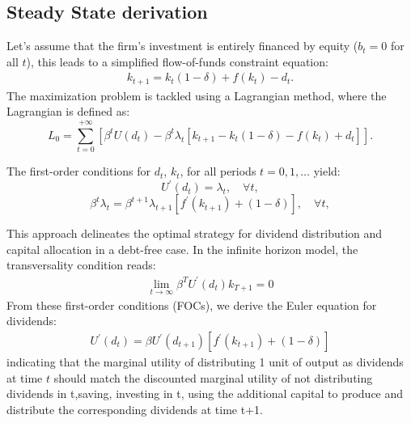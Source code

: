 \documentclass[12pt]{report}
\begin{document}
\subsection{Steady State derivation}
Let's assume that the firm's investment is entirely financed by equity (\(b_t=0\)  for all \(t\)), this leads to a simplified flow-of-funds constraint equation:
\begin{align}
    k_{t+1} = k_{t}(1 - \delta) + f(k_{t}) - d_{t}.  \label{eq13}
\end{align}
The maximization problem is tackled using a Lagrangian method, where the Lagrangian is defined as:
\[L_0 = \sum_{t=0}^{+\infty}\left[{\beta^t U(d_t) - \beta^t \lambda_t\left[k_{t+1} - k_{t}(1 - \delta) - f(k_t) + d_t\right]}\right].\]

The first-order conditions for \(d_{t}\), \(k_{t}\), for all periods \(t=0,1,\ldots\) yield:
\[
U^{\prime}(d_{t}) = \lambda_t, \quad \forall t,
\]
\[
\beta^t \lambda_t = \beta^{t+1} \lambda_{t+1}[f^{\prime}(k_{t+1}) + (1-\delta)], \quad \forall t,
\]


This approach delineates the optimal strategy for dividend distribution and capital allocation in a debt-free
case.
In the infinite horizon model, the transversality condition reads:
\begin{align}
    \lim _{t \rightarrow \infty} \beta^T U^{\prime}\left(d_{t}\right) k_{T+1}=0 \label{eq26}
\end{align}
From these first-order conditions (FOCs), we derive the Euler equation for dividends:
\begin{align}
    U^{\prime}(d_{t}) = \beta U^{\prime}(d_{t+1})[f^{\prime}(k_{t+1}) + (1-\delta)]  \label{eq14}
\end{align}
indicating that the marginal utility of distributing 1 unit of output as dividends at time \(t\) should match the discounted marginal
utility of not distributing  dividends in t,saving, investing in t, using the additional capital to produce and
distribute the corresponding dividends at time t+1.
\end{document}
